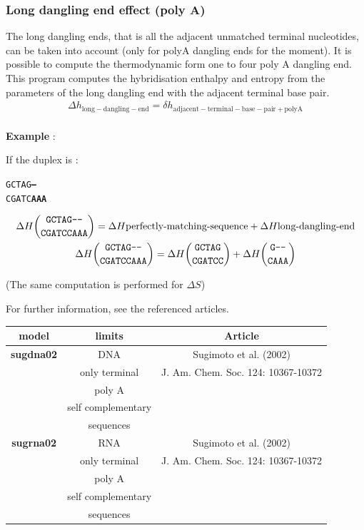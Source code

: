 \documentclass{article}
\begin{document}
\pagebreak
\subsubsection{Long dangling end effect (poly A)}

The long dangling ends, that is all the adjacent unmatched terminal nucleotides, can be taken into
account (only for polyA dangling ends for the moment). It is possible to compute the thermodynamic 
form one to four poly A dangling end. This program computes the hybridisation enthalpy 
and entropy from the parameters of the long dangling end with the adjacent terminal base pair.  
\begin{multline*}
\Delta{}h_\mathrm{long-dangling-end} =
\delta{}h_\mathrm{adjacent-terminal-base-pair+polyA} \\ 
\end{multline*}

\textbf{Example} :

If the duplex is :
\begin{alltt}
GCTAG\textbf{---}
CGATC\textbf{AAA}
\end{alltt}
\begin{multline*}
\Delta H {\mbox{\texttt{GCTAG---}} \choose \mbox{\texttt{CGATCCAAA}}} =
\Delta H {\mbox{perfectly-matching-sequence}} +
\Delta H {\mbox{long-dangling-end}} \\
\Delta H {\mbox{\texttt{GCTAG---}} \choose \mbox{\texttt{CGATCCAAA}}} =
\Delta H {\mbox{\texttt{GCTAG}} \choose \mbox{\texttt{CGATCC}}} +
\Delta H {\mbox{\texttt{G---}} \choose \mbox{\texttt{CAAA}}} \\
\end{multline*}

       (The same computation is performed for $\Delta S$)

For further information, see the referenced articles.

\begin{table}[hc]
\begin{tabular}[h]{| c | c | c |}
\textbf{model} & \textbf{limits} & \textbf{Article} \\
\hline
\textbf{sugdna02} & DNA & Sugimoto et al. (2002)\\
 & only terminal & J. Am. Chem. Soc. 124: 10367-10372 \\
 & poly A & \\
 & self complementary & \\
 & sequences & \\
 \hline
\textbf{sugrna02} & RNA & Sugimoto et al. (2002)\\
 & only terminal & J. Am. Chem. Soc. 124: 10367-10372 \\
 & poly A & \\
 & self complementary & \\
 & sequences & \\
 \hline
\end{tabular}
\end{table}
\end{document}
